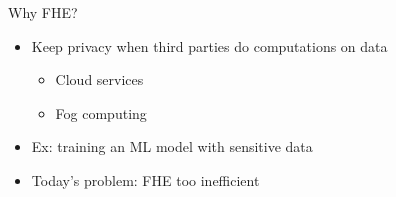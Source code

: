 \documentclass[aspectratio=169]{beamer}
\begin{document}
\begin{frame}{Why FHE?}
    \begin{itemize}
        \item Keep privacy when third parties do computations on data
        \begin{itemize}
            \item Cloud services
            \item Fog computing
        \end{itemize}
    \end{itemize}


    \begin{itemize}
        \item Ex: training an ML model with sensitive data
    \end{itemize}

    \begin{itemize}
        \item Today's problem: FHE too inefficient
    \end{itemize}
\end{frame}




\end{document}
